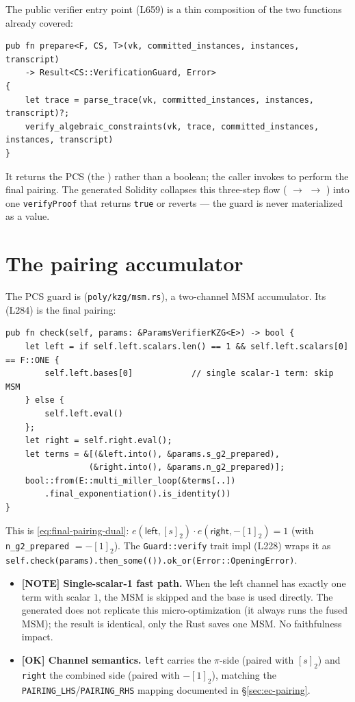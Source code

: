 The public verifier entry point
 (L659) is a thin composition of the
two functions already covered:
\begin{lstlisting}[style=rust]
pub fn prepare<F, CS, T>(vk, committed_instances, instances, transcript)
    -> Result<CS::VerificationGuard, Error>
{
    let trace = parse_trace(vk, committed_instances, instances, transcript)?;
    verify_algebraic_constraints(vk, trace, committed_instances, instances, transcript)
}
\end{lstlisting}
It returns the PCS  (the ) rather
than a boolean; the caller invokes  to perform the
final pairing. The generated Solidity collapses this three-step flow
( $\to$  $\to$
) into one \texttt{verifyProof} that returns
\texttt{true} or reverts --- the guard is never materialized as a value.

\section{The  pairing accumulator}
\label{sec:rust-dualmsm}

The PCS guard is  (\texttt{poly/kzg/msm.rs}), a
two-channel MSM accumulator. Its  (L284) is the final
pairing:
\begin{lstlisting}[style=rust]
pub fn check(self, params: &ParamsVerifierKZG<E>) -> bool {
    let left = if self.left.scalars.len() == 1 && self.left.scalars[0] == F::ONE {
        self.left.bases[0]            // single scalar-1 term: skip MSM
    } else {
        self.left.eval()
    };
    let right = self.right.eval();
    let terms = &[(&left.into(), &params.s_g2_prepared),
                 (&right.into(), &params.n_g2_prepared)];
    bool::from(E::multi_miller_loop(&terms[..])
        .final_exponentiation().is_identity())
}
\end{lstlisting}
This is \eqref{eq:final-pairing-dual}:
$e(\mathsf{left},[s]_2)\cdot e(\mathsf{right},-[1]_2)=1$ (with
\texttt{n\_g2\_prepared} $=-[1]_2$). The \texttt{Guard::verify} trait
impl (L228) wraps it as
\texttt{self.check(params).then\_\allowbreak{}some(()).ok\_\allowbreak{}or(Error::OpeningError)}.

\begin{itemize}
  \item \textcolor{mathpurple}{\textbf{[NOTE] Single-scalar-1 fast path.}}
        When the left channel has exactly one term with scalar $1$, the
        MSM is skipped and the base is used directly. The generated
         does not replicate this micro-optimization
        (it always runs the fused MSM); the result is identical, only
        the Rust saves one MSM. No faithfulness impact.
  \item \textcolor{tracegreen}{\textbf{[OK] Channel semantics.}}
        \texttt{left} carries the $\pi$-side (paired with $[s]_2$) and
        \texttt{right} the combined side (paired with $-[1]_2$),
        matching the \texttt{PAIRING\_LHS}/\texttt{PAIRING\_RHS}
        mapping documented in \S\ref{sec:ec-pairing}.
\end{itemize}

